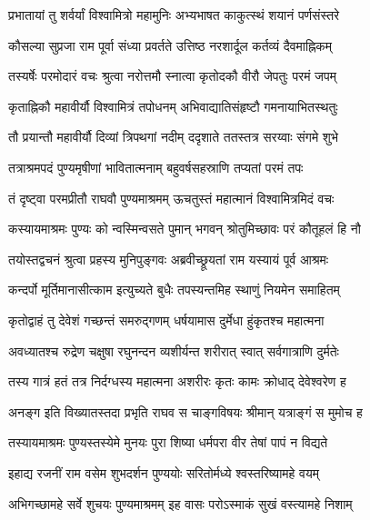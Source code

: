 
\twolineshloka
{प्रभातायां तु शर्वर्यां विश्वामित्रो महामुनिः}
{अभ्यभाषत काकुत्स्थं शयानं पर्णसंस्तरे} %

\twolineshloka
{कौसल्या सुप्रजा राम पूर्वा संध्या प्रवर्तते}
{उत्तिष्ठ नरशार्दूल कर्तव्यं दैवमाह्निकम्} %

\twolineshloka
{तस्यर्षेः परमोदारं वचः श्रुत्वा नरोत्तमौ}
{स्नात्वा कृतोदकौ वीरौ जेपतुः परमं जपम्} %

\twolineshloka
{कृताह्निकौ महावीर्यौ विश्वामित्रं तपोधनम्}
{अभिवाद्यातिसंहृष्टौ गमनायाभितस्थतुः} %

\twolineshloka
{तौ प्रयान्तौ महावीर्यौ दिव्यां त्रिपथगां नदीम्}
{ददृशाते ततस्तत्र सरय्वाः संगमे शुभे} %

\twolineshloka
{तत्राश्रमपदं पुण्यमृषीणां भावितात्मनाम्}
{बहुवर्षसहस्राणि तप्यतां परमं तपः} %

\twolineshloka
{तं दृष्ट्वा परमप्रीतौ राघवौ पुण्यमाश्रमम्}
{ऊचतुस्तं महात्मानं विश्वामित्रमिदं वचः} %

\twolineshloka
{कस्यायमाश्रमः पुण्यः को न्वस्मिन्वसते पुमान्}
{भगवन् श्रोतुमिच्छावः परं कौतूहलं हि नौ} %

\twolineshloka
{तयोस्तद्वचनं श्रुत्वा प्रहस्य मुनिपुङ्गवः}
{अब्रवीच्छ्रूयतां राम यस्यायं पूर्व आश्रमः} %

\twolineshloka
{कन्दर्पो मूर्तिमानासीत्काम इत्युच्यते बुधैः}
{तपस्यन्तमिह स्थाणुं नियमेन समाहितम्} %

\twolineshloka
{कृतोद्वाहं तु देवेशं गच्छन्तं समरुद्गणम्}
{धर्षयामास दुर्मेधा हुंकृतश्च महात्मना} %

\twolineshloka
{अवध्यातश्च रुद्रेण चक्षुषा रघुनन्दन}
{व्यशीर्यन्त शरीरात् स्वात् सर्वगात्राणि दुर्मतेः} %

\twolineshloka
{तस्य गात्रं हतं तत्र निर्दग्धस्य महात्मना}
{अशरीरः कृतः कामः क्रोधाद् देवेश्वरेण ह} %

\twolineshloka
{अनङ्ग इति विख्यातस्तदा प्रभृति राघव}
{स चाङ्गविषयः श्रीमान् यत्राङ्गं स मुमोच ह} %

\twolineshloka
{तस्यायमाश्रमः पुण्यस्तस्येमे मुनयः पुरा}
{शिष्या धर्मपरा वीर तेषां पापं न विद्यते} %

\twolineshloka
{इहाद्य रजनीं राम वसेम शुभदर्शन}
{पुण्ययोः सरितोर्मध्ये श्वस्तरिष्यामहे वयम्} %

\twolineshloka
{अभिगच्छामहे सर्वे शुचयः पुण्यमाश्रमम्}
{इह वासः परोऽस्माकं सुखं वस्त्यामहे निशाम्} %

